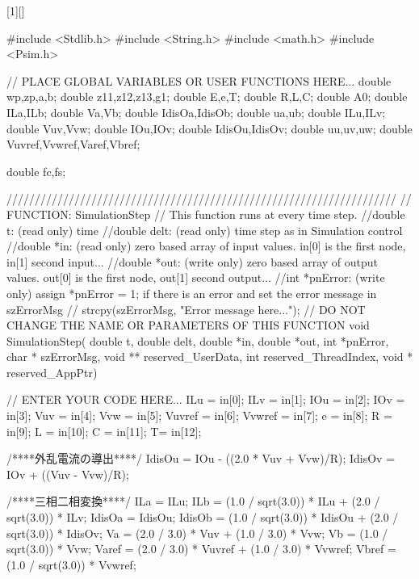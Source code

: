 
[1][]
    {\lstset{
        frame=single,
        numbersep=10pt,
        tabsize=2,
        #1
    }
}{}
\begin{mylisting}[language=c,caption=SRDCDB制御モジュール,label=hurokuB_SRDBcontrol]

#include <Stdlib.h>
#include <String.h>
#include <math.h>
#include <Psim.h>

// PLACE GLOBAL VARIABLES OR USER FUNCTIONS HERE...
double wp,zp,a,b;
double z11,z12,z13,g1;
double E,e,T;
double R,L,C;
double A0;
double ILa,ILb;
double Va,Vb;
double IdisOa,IdisOb;
double ua,ub;
double ILu,ILv;
double Vuv,Vvw;
double IOu,IOv;
double IdisOu,IdisOv;
double uu,uv,uw;
double Vuvref,Vvwref,Varef,Vbref;

double fc,fs;

/////////////////////////////////////////////////////////////////////
// FUNCTION: SimulationStep
//   This function runs at every time step.
//double t: (read only) time
//double delt: (read only) time step as in Simulation control
//double *in: (read only) zero based array of input values. in[0] is the first node, in[1] second input...
//double *out: (write only) zero based array of output values. out[0] is the first node, out[1] second output...
//int *pnError: (write only)  assign  *pnError = 1;  if there is an error and set the error message in szErrorMsg
//    strcpy(szErrorMsg, "Error message here..."); 
// DO NOT CHANGE THE NAME OR PARAMETERS OF THIS FUNCTION
void SimulationStep(
		double t, double delt, double *in, double *out,
		 int *pnError, char * szErrorMsg,
		 void ** reserved_UserData, int reserved_ThreadIndex, void * reserved_AppPtr)
{
// ENTER YOUR CODE HERE...
ILu = in[0];
ILv =  in[1];
IOu = in[2];
IOv = in[3];
Vuv = in[4];
Vvw = in[5];
Vuvref = in[6];
Vvwref = in[7];
e = in[8];
R = in[9];
L = in[10];
C = in[11];
T= in[12];

/****外乱電流の導出****/
IdisOu = IOu - ((2.0 * Vuv + Vvw)/R);
IdisOv = IOv + ((Vuv - Vvw)/R);


/****三相二相変換****/
ILa = ILu;
ILb = (1.0 / sqrt(3.0)) * ILu + (2.0 / sqrt(3.0)) * ILv;
IdisOa = IdisOu;
IdisOb = (1.0 / sqrt(3.0)) * IdisOu + (2.0 / sqrt(3.0)) * IdisOv;
Va = (2.0 / 3.0) * Vuv + (1.0 / 3.0) * Vvw;
Vb = (1.0 / sqrt(3.0)) * Vvw; 
Varef = (2.0 / 3.0) * Vuvref + (1.0 / 3.0) * Vvwref;
Vbref = (1.0 / sqrt(3.0)) * Vvwref; 


}
\end{mylisting}
